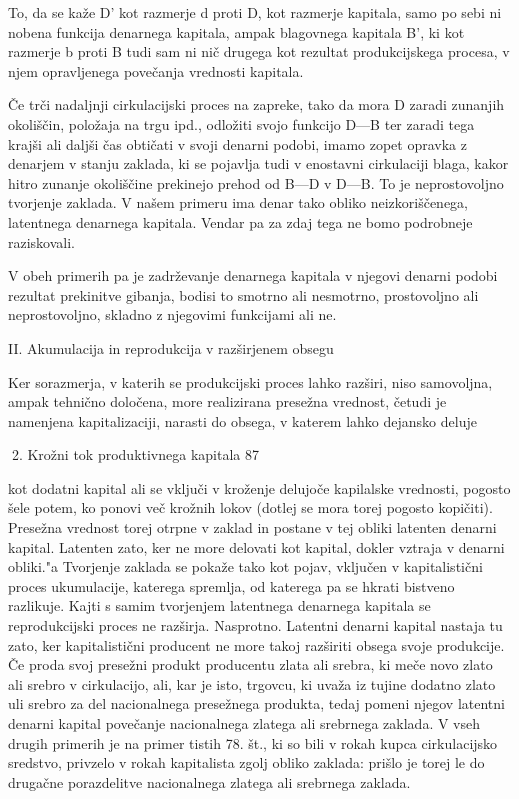 \documentclass[kapital_02.tex]{subfiles}
\begin{document}
To, da se kaže D' kot razmerje d proti D, kot razmerje kapitala, samo po sebi ni nobena funkcija denarnega kapitala, ampak blagovnega kapitala B', ki kot razmerje b proti B tudi sam ni nič drugega kot rezultat produkcijskega procesa, v njem opravljenega povečanja vrednosti kapitala.

Če trči nadaljnji cirkulacijski proces na zapreke, tako da mora D zaradi zunanjih okoliščin, položaja na trgu ipd., odložiti svojo funkcijo D—B ter zaradi tega krajši ali daljši čas obtičati v svoji denarni podobi, imamo zopet opravka z denarjem v stanju zaklada, ki se pojavlja tudi v enostavni cirkulaciji blaga, kakor hitro zunanje okoliščine prekinejo prehod od B—D v D—B. To je neprostovoljno tvorjenje zaklada. V našem primeru ima denar tako obliko neizkoriščenega, latentnega denarnega kapitala. Vendar pa za zdaj tega ne bomo podrobneje raziskovali.

V obeh primerih pa je zadrževanje denarnega kapitala v njegovi denarni podobi rezultat prekinitve gibanja, bodisi to smotrno ali nesmotrno, prostovoljno ali neprostovoljno, skladno z njegovimi funkcijami ali ne.

II. Akumulacija in reprodukcija v razširjenem obsegu

Ker sorazmerja, v katerih se produkcijski proces lahko razširi, niso samovoljna, ampak tehnično določena, more realizirana presežna vrednost, četudi je namenjena kapitalizaciji, narasti do obsega, v katerem lahko dejansko deluje



2. Krožni tok produktivnega kapitala 87



 kot dodatni kapital ali se vključi v kroženje delujoče kapilalske vrednosti, pogosto šele potem, ko ponovi več krožnih lokov (dotlej se mora torej pogosto kopičiti). Presežna vrednost torej otrpne v zaklad in postane v tej obliki latenten denarni kapital. Latenten zato, ker ne more delovati kot kapital, dokler vztraja v denarni obliki."a Tvorjenje zaklada se pokaže tako kot pojav, vključen v kapitalistični proces ukumulacije, katerega spremlja, od katerega pa se hkrati bistveno razlikuje. Kajti s samim tvorjenjem latentnega denarnega kapitala se reprodukcijski proces ne razširja. Nasprotno. Latentni denarni kapital nastaja tu zato, ker kapitalistični producent ne more takoj razširiti obsega svoje produkcije. Če proda svoj presežni produkt producentu zlata ali srebra, ki meče novo zlato ali srebro v cirkulacijo, ali, kar je isto, trgovcu, ki uvaža iz tujine dodatno zlato uli srebro za del nacionalnega presežnega produkta, tedaj pomeni njegov latentni denarni kapital povečanje nacionalnega zlatega ali srebrnega zaklada. V vseh drugih primerih je na primer tistih 78. št., ki so bili v rokah kupca cirkulacijsko sredstvo, privzelo v rokah kapitalista zgolj obliko zaklada: prišlo je torej le do drugačne porazdelitve nacionalnega zlatega ali srebrnega zaklada.
\end{document}
